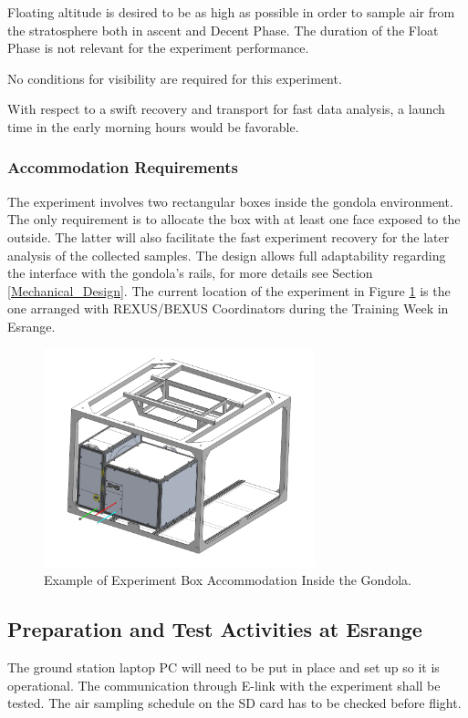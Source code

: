 \documentclass[a4paper,12pt,twoside]{article}
\begin{document}
Floating altitude is desired to be as high as possible in order to sample air from the stratosphere both in ascent and Decent Phase. The duration of the Float Phase is not relevant for the experiment performance. 

\smallskip
No conditions for visibility are required for this experiment.

\smallskip
With respect to a swift recovery and transport for fast data analysis, a launch time in the early morning hours would be favorable.

\pagebreak
\subsubsection{Accommodation Requirements}

The experiment involves two rectangular boxes inside the gondola environment. The only requirement is to allocate the box with at least one face exposed to the outside. The latter will also facilitate the fast experiment recovery for the later analysis of the collected samples. The design allows full adaptability regarding the interface with the gondola's rails, for more details see Section \ref{Mechanical_Design}. The current location of the experiment in Figure \ref{goldola_accommodation} is the one arranged with REXUS/BEXUS Coordinators during the Training Week in Esrange.

\begin{figure}[H]
    \centering
    \includegraphics[width=0.7\textwidth]{6-launch-campaign-preparation/img/Gondola_Placement.PNG}
    \caption{Example of Experiment Box Accommodation Inside the Gondola.}
    \label{goldola_accommodation}
\end{figure}
\pagebreak
\subsection{Preparation and Test Activities at Esrange}\label{prep_for_Esrange}
The ground station laptop PC will need to be put in place and set up so it is operational. The communication through E-link with the experiment shall be tested. The air sampling schedule on the SD card has to be checked before flight.
\end{document}
